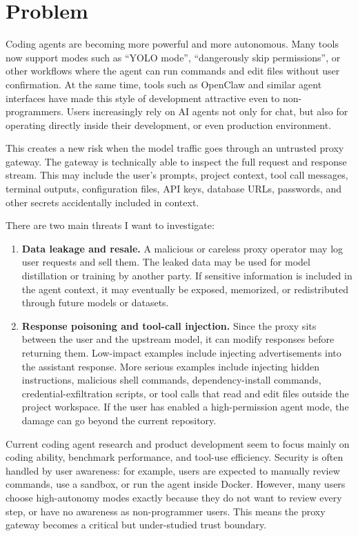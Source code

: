 \documentclass[11pt]{article}
\begin{document}
\section*{Problem}

Coding agents are becoming more powerful and more autonomous. Many tools now support modes such as ``YOLO mode'', ``dangerously skip permissions'', or other workflows where the agent can run commands and edit files without user confirmation. At the same time, tools such as OpenClaw and similar agent interfaces have made this style of development attractive even to non-programmers. Users increasingly rely on AI agents not only for chat, but also for operating directly inside their development, or even production environment.

This creates a new risk when the model traffic goes through an untrusted proxy gateway. The gateway is technically able to inspect the full request and response stream. This may include the user's prompts, project context, tool call messages, terminal outputs, configuration files, API keys, database URLs, passwords, and other secrets accidentally included in context.

There are two main threats I want to investigate:

\begin{enumerate}[leftmargin=*]
  \item \textbf{Data leakage and resale.} A malicious or careless proxy operator may log user requests and sell them. The leaked data may be used for model distillation or training by another party. If sensitive information is included in the agent context, it may eventually be exposed, memorized, or redistributed through future models or datasets.
  \item \textbf{Response poisoning and tool-call injection.} Since the proxy sits between the user and the upstream model, it can modify responses before returning them. Low-impact examples include injecting advertisements into the assistant response. More serious examples include injecting hidden instructions, malicious shell commands, dependency-install commands, credential-exfiltration scripts, or tool calls that read and edit files outside the project workspace. If the user has enabled a high-permission agent mode, the damage can go beyond the current repository.
\end{enumerate}

Current coding agent research and product development seem to focus mainly on coding ability, benchmark performance, and tool-use efficiency. Security is often handled by user awareness: for example, users are expected to manually review commands, use a sandbox, or run the agent inside Docker. However, many users choose high-autonomy modes exactly because they do not want to review every step, or have no awareness as non-programmer users. This means the proxy gateway becomes a critical but under-studied trust boundary.
\end{document}
